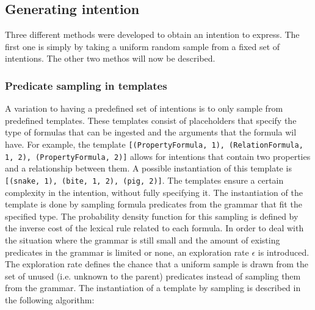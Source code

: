 \documentclass[a4paper]{article}
\begin{document}
\subsection{Generating intention}
Three different methods were developed to obtain an intention to express. The first one is simply by taking a uniform random sample from a fixed set of intentions. The other two methos will now be described.
\subsubsection{Predicate sampling in templates}
\label{sec:predicate_sampling}
A variation to having a predefined set of intentions is to only sample from predefined templates. These templates consist of placeholders that specify the type of formulas that can be ingested and the arguments that the formula wil have. For example, the template \verb|[(PropertyFormula, 1), (RelationFormula, 1, 2), (PropertyFormula, 2)]| allows for intentions that contain two properties and a relationship between them. A possible instantiation of this template is \verb|[(snake, 1), (bite, 1, 2), (pig, 2)]|. The templates ensure a certain complexity in the intention, without fully specifying it. The instantiation of the template is done by sampling formula predicates from the grammar that fit the specified type. The probability density function for this sampling is defined by the inverse cost of the lexical rule related to each formula. In order to deal with the situation where the grammar is still small and the amount of existing predicates in the grammar is limited or none, an exploration rate $\epsilon$ is introduced. The exploration rate defines the chance that a uniform sample is drawn from the set of unused (i.e. unknown to the parent) predicates instead of sampling them from the grammar. The instantiation of a template by sampling is described in the following algorithm:
\end{document}
